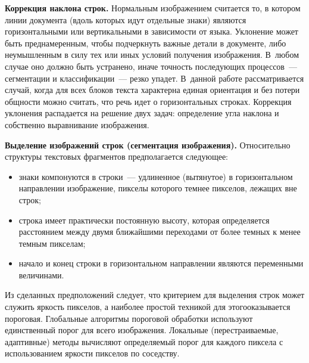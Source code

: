        \begin{multicols}{2}
      
      \textbf{Коррекция наклона строк.} Нормальным изображением считается то, в 
котором линии документа (вдоль которых идут отдельные знаки) являются 
горизонтальными или вертикальными в зависимости от языка. Уклонение может быть 
преднамеренным, чтобы подчеркнуть важные детали в документе, либо неумышленным в 
силу тех или иных условий получения изображения. В~любом случае оно должно быть 
устранено, иначе точность последующих процессов~--- сегментации и классификации~--- 
резко упадет. В~данной работе рассматривается случай, когда для всех блоков текста 
характерна единая ориентация и без потери общности можно считать, что речь идет о 
горизонтальных строках. Коррекция уклонения распадается на решение двух задач: 
определение угла наклона и собственно выравнивание изображения. 
      
      \smallskip
      
      \textbf{Выделение изображений строк (сегментация изоб\-ра\-же\-ния).} 
Относительно структуры текстовых фрагментов предполагается следующее:
      \begin{itemize}
\item знаки компонуются в строки~--- удлиненное (вытянутое) в горизонтальном 
направлении изображение, пикселы которого темнее пикселов, лежащих вне строк;
\item строка имеет практически постоянную высоту, которая определяется 
расстоянием между двумя ближайшими переходами от более темных к менее темным 
пикселам;
\item начало и конец строки в горизонтальном на\-прав\-ле\-нии являются переменными 
величи\-нами.
\end{itemize}
      
      Из сделанных предположений следует, что критерием для выделения строк может 
служить яркость пикселов, а наиболее простой техникой для этого\linebreak оказывается пороговая. 
Глобальные алгоритмы порого\-вой обработки используют единственный порог для всего 
изображения. Локальные (перестраиваемые, адаптивные) методы вычисляют 
определяемый порог для каждого пиксела с использованием яркости пикселов по 
соседству. 
      
      
       

\end{multicols}
